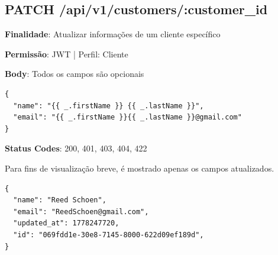 \subsection{PATCH /api/v1/customers/:customer\_id}

\noindent\textbf{Finalidade}: Atualizar informações de um cliente específico

\noindent\textbf{Permissão}: JWT | Perfil: Cliente

\noindent\textbf{Body}: Todos os campos são opcionais

\begin{verbatim}
{
  "name": "{{ _.firstName }} {{ _.lastName }}",
  "email": "{{ _.firstName }}{{ _.lastName }}@gmail.com"
}
\end{verbatim}

\noindent\textbf{Status Codes}: 200, 401, 403, 404, 422

\begin{tcolorbox}[colback=green!5, colframe=black, title=\textbf{200 OK}]
Para fins de visualização breve, é mostrado apenas os campos atualizados.
\begin{verbatim}
{
  "name": "Reed Schoen",
  "email": "ReedSchoen@gmail.com",
  "updated_at": 1778247720,
  "id": "069fdd1e-30e8-7145-8000-622d09ef189d",
}
\end{verbatim}
\end{tcolorbox}
